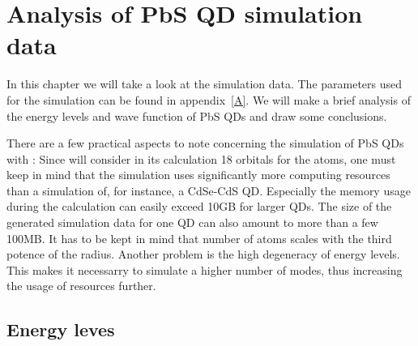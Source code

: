 \chapter{Analysis of PbS QD simulation data}

In this chapter we will take a look at the simulation data. The parameters used for the simulation can be found in appendix~\ref{A}. We will make a brief analysis of the energy levels and wave function of PbS QDs and draw some conclusions.\\

\begin{REMARK} 
There are a few practical aspects to note concerning the simulation of PbS QDs with \omen: Since \omen will consider in its calculation 18 orbitals for the atoms, one must keep in mind that the simulation uses significantly more computing resources than a simulation of, for instance, a CdSe-CdS QD. Especially the memory usage during the calculation can easily exceed 10GB for larger QDs. The size of the generated simulation data for one QD can also amount to more than a few 100MB. It has to be kept in mind that number of atoms scales with the third potence of the radius. Another problem is the high degeneracy of energy levels. This makes it necessarry to simulate a higher number of modes, thus increasing the usage of resources further.
\end{REMARK}

\section{Energy leves}

